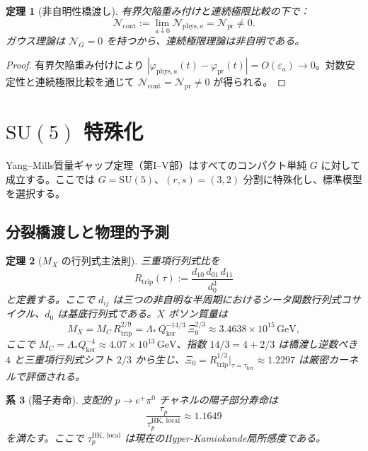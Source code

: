 \documentclass[12pt]{article}
\theoremstyle{plain}
\newtheorem{theorem}{定理}[section]
\newtheorem{corollary}[theorem]{系}
\theoremstyle{definition}
\numberwithin{equation}{section}
\newcommand{\pr}{\mathrm{pr}}
\newcommand{\phys}{\mathrm{phys}}
\newcommand{\kker}{\mathrm{ker}}
\begin{document}
\begin{theorem}[非自明性橋渡し]\label{thm:nontriviality}
有界欠陥重み付けと連続極限比較の下で：
\begin{equation}
\mathcal{N}_{\mathrm{cont}} := \lim_{a\downarrow 0}\mathcal{N}_{\phys,a} = \mathcal{N}_{\pr} \neq 0.
\end{equation}
ガウス理論は $\mathcal{N}_G=0$ を持つから、連続極限理論は非自明である。
\end{theorem}

\begin{proof}
有界欠陥重み付けにより $|\varphi_{\phys,a}(t)-\varphi_{\pr}(t)|=O(\varepsilon_a)\to 0$。対数安定性と連続極限比較を通じて $\mathcal{N}_{\mathrm{cont}}=\mathcal{N}_{\pr}\neq 0$ が得られる。
\end{proof}

\section{$\mathrm{SU}(5)$ 特殊化}\label{sec:SU5}

Yang--Mills質量ギャップ定理（第I--V部）はすべてのコンパクト単純 $G$ に対して成立する。ここでは $G=\mathrm{SU}(5)$、$(r,s)=(3,2)$ 分割に特殊化し、標準模型を選択する。

\subsection{分裂橋渡しと物理的予測}

\begin{theorem}[$M_X$ の行列式主法則]\label{thm:protondecay}
三重項行列式比を
\begin{equation}
R_{\mathrm{trip}}(\tau) := \frac{d_{10}\,d_{01}\,d_{11}}{d_0^3}
\end{equation}
と定義する。ここで $d_{ij}$ は三つの非自明な半周期におけるシータ関数行列式コサイクル、$d_0$ は基底行列式である。$X$ ボソン質量は
\begin{equation}
\boxed{M_X = M_C\,R_{\mathrm{trip}}^{2/9} = \Lambda_*\,Q_{\kker}^{-14/3}\,\Xi_0^{2/3} \approx 3.4638\times 10^{15}\,\mathrm{GeV},}
\end{equation}
ここで $M_C=\Lambda_* Q_{\kker}^{-4}\approx 4.07\times 10^{13}\,\mathrm{GeV}$、指数 $14/3=4+2/3$ は橋渡し逆数べき $4$ と三重項行列式シフト $2/3$ から生じ、$\Xi_0=R_{\mathrm{trip}}^{1/3}\big|_{\tau=\tau_{\kker}}\approx 1.2297$ は厳密カーネルで評価される。
\end{theorem}

\begin{corollary}[陽子寿命]\label{cor:protonlifetime}
支配的 $p\to e^+\pi^0$ チャネルの陽子部分寿命は
\begin{equation}
\frac{\tau_p}{\tau_p^{\mathrm{HK,\,local}}} \approx 1.1649
\end{equation}
を満たす。ここで $\tau_p^{\mathrm{HK,\,local}}$ は現在のHyper-Kamiokande局所感度である。
\end{corollary}
\end{document}
